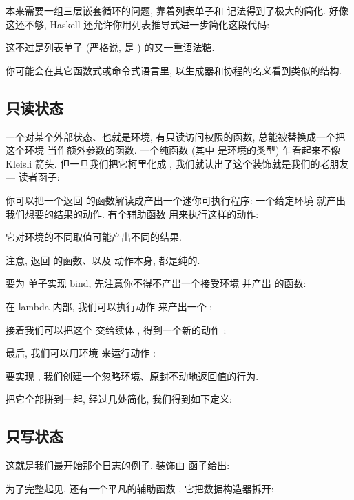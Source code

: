 本来需要一组三层嵌套循环的问题, 靠着列表单子和  记法得到了极大的简化. 好像
这还不够, Haskell 还允许你用列表推导式进一步简化这段代码:

这不过是列表单子 (严格说, 是 ) 的又一重语法糖.

你可能会在其它函数式或命令式语言里, 以生成器和协程的名义看到类似的结构.

\subsection{只读状态}

一个对某个外部状态、也就是环境, 有只读访问权限的函数, 总能被替换成一个把这个环境
当作额外参数的函数. 一个纯函数  (其中  是环境的类型)
乍看起来不像 Kleisli 箭头. 但一旦我们把它柯里化成
, 我们就认出了这个装饰就是我们的老朋友 --- 读者函子:

你可以把一个返回  的函数解读成产出一个迷你可执行程序: 一个给定环境
就产出我们想要的结果的动作. 有个辅助函数  用来执行这样的动作:

它对环境的不同取值可能产出不同的结果.

注意, 返回  的函数、以及  动作本身, 都是纯的.

要为  单子实现 bind, 先注意你不得不产出一个接受环境 
并产出  的函数:

在 lambda 内部, 我们可以执行动作  来产出一个 :

接着我们可以把这个  交给续体 , 得到一个新的动作 :

最后, 我们可以用环境  来运行动作 :

要实现 , 我们创建一个忽略环境、原封不动地返回值的行为.

把它全部拼到一起, 经过几处简化, 我们得到如下定义:


\subsection{只写状态}

这就是我们最开始那个日志的例子. 装饰由  函子给出:

为了完整起见, 还有一个平凡的辅助函数 , 它把数据构造器拆开:

